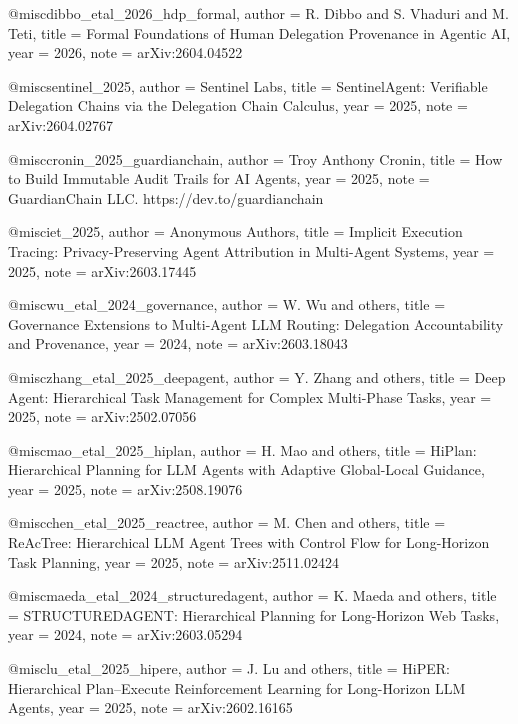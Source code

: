 @misc{dibbo_etal_2026_hdp_formal,
  author       = {R. Dibbo and S. Vhaduri and M. Teti},
  title        = {Formal Foundations of Human Delegation Provenance in Agentic AI},
  year         = {2026},
  note         = {arXiv:2604.04522}
}

@misc{sentinel_2025,
  author       = {Sentinel Labs},
  title        = {SentinelAgent: Verifiable Delegation Chains via the Delegation Chain Calculus},
  year         = {2025},
  note         = {arXiv:2604.02767}
}

@misc{cronin_2025_guardianchain,
  author       = {Troy Anthony Cronin},
  title        = {How to Build Immutable Audit Trails for AI Agents},
  year         = {2025},
  note         = {GuardianChain LLC. https://dev.to/guardianchain}
}

@misc{iet_2025,
  author       = {Anonymous Authors},
  title        = {Implicit Execution Tracing: Privacy-Preserving Agent Attribution in Multi-Agent Systems},
  year         = {2025},
  note         = {arXiv:2603.17445}
}

@misc{wu_etal_2024_governance,
  author       = {W. Wu and others},
  title        = {Governance Extensions to Multi-Agent LLM Routing: Delegation Accountability and Provenance},
  year         = {2024},
  note         = {arXiv:2603.18043}
}

@misc{zhang_etal_2025_deepagent,
  author       = {Y. Zhang and others},
  title        = {Deep Agent: Hierarchical Task Management for Complex Multi-Phase Tasks},
  year         = {2025},
  note         = {arXiv:2502.07056}
}

@misc{mao_etal_2025_hiplan,
  author       = {H. Mao and others},
  title        = {HiPlan: Hierarchical Planning for LLM Agents with Adaptive Global-Local Guidance},
  year         = {2025},
  note         = {arXiv:2508.19076}
}

@misc{chen_etal_2025_reactree,
  author       = {M. Chen and others},
  title        = {ReAcTree: Hierarchical LLM Agent Trees with Control Flow for Long-Horizon Task Planning},
  year         = {2025},
  note         = {arXiv:2511.02424}
}

@misc{maeda_etal_2024_structuredagent,
  author       = {K. Maeda and others},
  title        = {STRUCTUREDAGENT: Hierarchical Planning for Long-Horizon Web Tasks},
  year         = {2024},
  note         = {arXiv:2603.05294}
}

@misc{lu_etal_2025_hipere,
  author       = {J. Lu and others},
  title        = {HiPER: Hierarchical Plan--Execute Reinforcement Learning for Long-Horizon LLM Agents},
  year         = {2025},
  note         = {arXiv:2602.16165}
}

